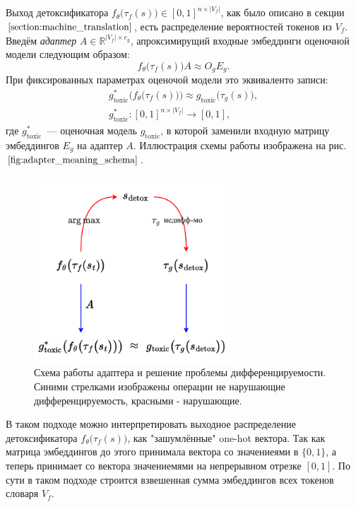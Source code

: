 Выход детоксификатора $f_{\theta}\bigl(\tau_{f}(s)\bigr) \in [0, 1]^{n \times |V_f|}$, как было описано в секции $\ref{section:machine_translation}$, есть распределение вероятностей токенов из $V_{f}$.
Введём \textit{адаптер} $A \in \mathbb{R}^{|V_f| \times e_{g}}$, апроксимирущий входные эмбеддинги оценочной модели следующим образом:
\begin{equation}\label{eqn:adapter_property}
    f_{\theta}\bigl(\tau_{f}(s)\bigr) A \approx O_{g} E_{g}.\tag{$\star$}
\end{equation}
При фиксированных параметрах оценочой модели это эквиваленто записи: 
\begin{gather*}
    g_{\text{toxic}}^{*} \bigl( f_{\theta}\bigl(\tau_{f}(s)\bigr)\bigr) 
    \approx g_{\text{toxic}} \bigl(\tau_{g} (s) \bigr), \\
    g_{\text{toxic}}^{*}: [0, 1]^{n \times |V_{f}|} \to [0, 1],
\end{gather*}
где $g_{\text{toxic}}^{*}$~--- оценочная модель $g_{\text{toxic}}$, в которой заменили входную матрицу эмбеддингов  $E_g$ на адаптер $A$.
Иллюстрация схемы работы изображена на рис. $\ref{fig:adapter_meaning_schema}$.
\begin{figure}[ht]
      \centering
      \includegraphics[width=0.66\textwidth]{images/non_diff_loss.pdf}
      \caption{
        Схема работы адаптера и решение проблемы дифференцируемости.
        Синими стрелками изображены операции не нарушающие  дифференцируемость, красными - нарушающие.
      }
      \label{fig:adapter_meaning_schema}
\end{figure}

В таком подходе можно интерпретировать выходное распределение детоксификатора $f_{\theta}\bigl(\tau_{f}(s)\bigr)$, как "зашумлённые" one-hot вектора.
Так как матрица эмбеддингов до этого принимала вектора со значениеями в $\{0, 1\}$, а теперь принимает со вектора значениемями на непрерывном отрезке $[0, 1]$.  
По сути в таком подходе строится взвешенная сумма эмбеддингов всех токенов словаря $V_{f}$. 


